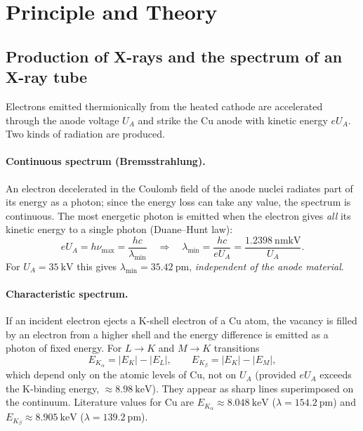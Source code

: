 \documentclass[11pt,a4paper]{article}
\begin{document}
\section{Principle and Theory}

\subsection{Production of X-rays and the spectrum of an X-ray tube}
Electrons emitted thermionically from the heated cathode are accelerated through the anode voltage $U_A$ and strike the Cu anode with kinetic energy $eU_A$. Two kinds of radiation are produced.

\paragraph{Continuous spectrum (Bremsstrahlung).} An electron decelerated in the Coulomb field of the anode nuclei radiates part of its energy as a photon; since the energy loss can take any value, the spectrum is continuous. The most energetic photon is emitted when the electron gives \emph{all} its kinetic energy to a single photon (Duane--Hunt law):
\begin{equation}
eU_A = h\nu_{\max} = \frac{hc}{\lambda_{\min}}
\quad\Longrightarrow\quad
\lambda_{\min}=\frac{hc}{eU_A}=\frac{1.2398\ \si{\nano\metre\kilo\volt}}{U_A}.
\label{eq:duane}
\end{equation}
For $U_A=\SI{35}{\kilo\volt}$ this gives $\lambda_{\min}=35.42\ \si{\pico\metre}$, \emph{independent of the anode material}.

\paragraph{Characteristic spectrum.} If an incident electron ejects a K-shell electron of a Cu atom, the vacancy is filled by an electron from a higher shell and the energy difference is emitted as a photon of fixed energy. For $L\to K$ and $M\to K$ transitions
\begin{equation}
E_{K_\alpha}=|E_K|-|E_L|,\qquad E_{K_\beta}=|E_K|-|E_M| ,
\end{equation}
which depend only on the atomic levels of Cu, not on $U_A$ (provided $eU_A$ exceeds the K-binding energy, $\approx\SI{8.98}{\kilo\electronvolt}$). They appear as sharp lines superimposed on the continuum. Literature values for Cu are $E_{K_\alpha}\approx\SI{8.048}{\kilo\electronvolt}$ ($\lambda=\SI{154.2}{\pico\metre}$) and $E_{K_\beta}\approx\SI{8.905}{\kilo\electronvolt}$ ($\lambda=\SI{139.2}{\pico\metre}$).
\end{document}
